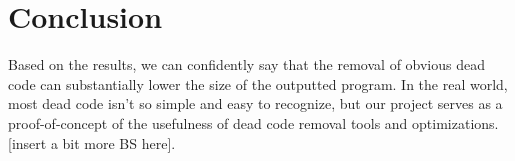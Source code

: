 \documentclass[sigconf]{acmart}
\begin{document}
\section{Conclusion}
Based on the results, we can confidently say that the removal of obvious dead code 
can substantially lower the size of the outputted program. In the real world, most 
dead code isn't so simple and easy to recognize, but our project serves as a 
proof-of-concept of the usefulness of dead code removal tools and optimizations. 
[insert a bit more BS here].
\end{document}
